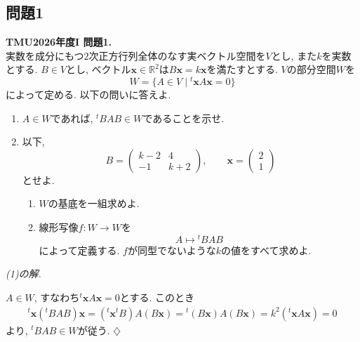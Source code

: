 \documentclass[titlepage]{jsarticle}
\numberwithin{equation}{section}
\newenvironment{kaitou}[1][解]{%
\begin{proofbox}%
\textit{#1. }\ignorespaces
}{%
\hfill$\diamondsuit$%
\end{proofbox}%
}
\begin{document}
\subsection{問題1}
\begin{problem}
\textbf{TMU2026年度I 問題1.}\\
実数を成分にもつ$2$次正方行列全体のなす実ベクトル空間を$V$とし, また$k$を実数とする. $B\in V$とし, ベクトル$\bm{x}\in\mathbb{R}^2$は$B\bm{x}=k\bm{x}$を満たすとする. $V$の部分空間$W$を
\[
W=\{A\in V\mid {}^t \bm{x}A\bm{x}=0\}
\]
によって定める. 以下の問いに答えよ.
\begin{enumerate}[label=(\arabic*)]
    \item $A\in W$であれば, ${}^t\!BAB\in W$であることを示せ.

    \item 以下,
    \[
    B=
    \begin{pmatrix}
    k-2 & 4\\
    -1 & k+2
    \end{pmatrix},
    \qquad
    \bm{x}=
    \begin{pmatrix}
    2\\
    1
    \end{pmatrix}
    \]
    とせよ.
    
    \begin{enumerate}[label=(\alph*)]
        \item $W$の基底を一組求めよ.

        \item 線形写像$f\colon W\to W$を
        \[
        A\mapsto {}^t\!BAB
        \]
        によって定義する. $f$が同型でないような$k$の値をすべて求めよ.
    \end{enumerate}
\end{enumerate}
\end{problem}
\begin{kaitou}[(1)の解]
$A \in W$, すなわち${}^t \bm{x}A\bm{x} = 0$とする. このとき
\begin{align*}
{}^t\bm{x}({}^t\!BAB)\bm{x} = ({}^t\bm{x}{}^t\!B)A(B\bm{x}) = {}^t\!(B\bm{x})A(B\bm{x}) = k^2 ({}^t\bm{x}A\bm{x}) = 0
\end{align*}
より, ${}^t\!BAB\in W$が従う.
\end{kaitou}
\end{document}

